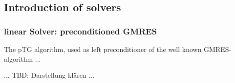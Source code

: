 \subsection{Introduction of solvers}

\subsubsection{linear Solver: preconditioned GMRES}
\label{sec:ptg_gmres}



\newcommand{\gvec}[1]{\boldsymbol{#1}}
\newcommand{\gmat}[1]{\boldsymbol{\mathrm{#1}}}

The pTG algorithm, used as left preconditioner of the well known GMRES-algorithm ...

... TBD: Darstellung klären ...


